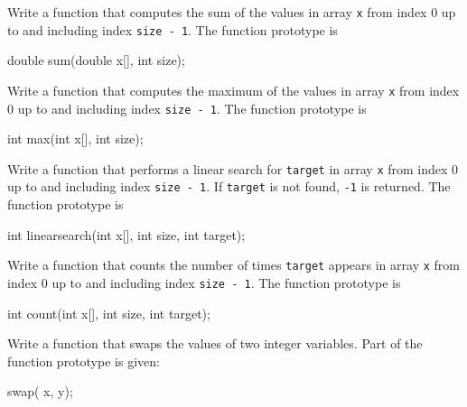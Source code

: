 

\nextq
Write a function that computes the sum of the
values in array \verb!x! from index 0 up to
and including index \verb!size - 1!.
The function prototype is
\begin{console}
double sum(double x[], int size);
\end{console}
\ANSWER
\begin{answercode}

\end{answercode}

\nextq
Write a function that
computes the maximum of the
values in array \verb!x! from index 0 up to
and including index \verb!size - 1!.
The function prototype is
\begin{console}
int max(int x[], int size);
\end{console}
\ANSWER
\begin{answercode}

\end{answercode}

\nextq
Write a function that performs a linear search
for \verb!target! in array \verb!x! from index 0 up to
and including index \verb!size - 1!.
If \verb!target! is not found, \verb!-1! is returned.
The function prototype is
\begin{console}
int linearsearch(int x[], int size, int target);
\end{console}
\ANSWER
\begin{answercode}

\end{answercode}

\nextq
Write a function that counts the number of times
\verb!target! appears in
array \verb!x! from index 0 up to
and including index \verb!size - 1!.
The function prototype is
\begin{console}
int count(int x[], int size, int target);
\end{console}
\ANSWER
\begin{answercode}

\end{answercode}

\nextq
Write a function that swaps the values of two integer variables.
Part of the function prototype is given:
\begin{console}
    swap(     x,    y);
\end{console}
\ANSWER
\begin{answercode}

\end{answercode}


